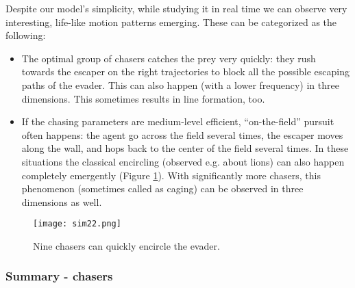 \documentclass[12pt,a4paper,final]{iopart}
\newcommand{\revision}{\textcolor{black}}
\begin{document}
Despite our model's simplicity, while studying it in real time we can observe very interesting, life-like motion patterns emerging. These can be categorized as the following:
\begin{itemize}
\item {The optimal group of chasers catches the prey very quickly: they rush towards the escaper on the right trajectories to block all the possible escaping paths of the evader. This can also happen (with a lower frequency) in three dimensions. This sometimes results in line formation, too\revision{.}}
\item {If the chasing parameters are medium-level efficient,  ``on-the-field'' pursuit often happens: the agent go across the field several times, the escaper moves along the wall, and hops back to the center of the field several times. In these situations the classical encircling (observed e.g. about lions) can also happen  completely emergently (Figure \ref{fig:sim}). With significantly more chasers, this phenomenon (sometimes called as caging) can be observed in three dimensions as well.}
\end{itemize}

\begin{figure}
\centering
\texttt{[image: sim22.png]} 
\caption{Nine chasers can quickly encircle the evader.}
\label{fig:sim}
\end{figure}




\subsubsection{Summary - chasers}
\end{document}
